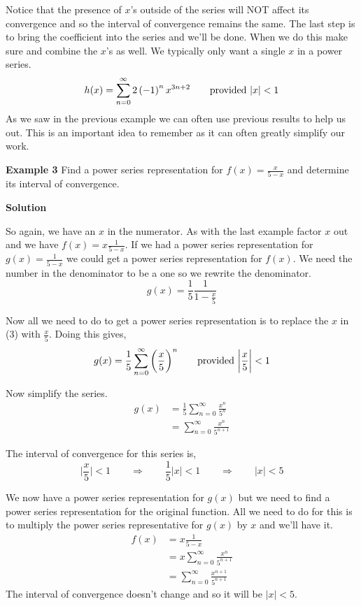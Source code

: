 \documentclass[10pt]{article}
\newcommand{\ds}{\displaystyle}
\begin{document}
Notice that the presence of $x$'s outside of the series will NOT affect its convergence and so the interval of convergence remains the same.  
The last step is to bring the coefficient into the series and we'll be done.  When we do this make sure and combine the $x$'s as well.  We typically only want a single $x$ in a power series.  
$$ h(x) = \sum\limits_{n=0}^{\infty}2\left( -1 \right)^n x^{3n+2} \qquad {\rm provided} \ |x|<1$$
As we saw in the previous example we can often use previous results to help us out.  This is an important idea to remember as it can often greatly simplify our work.  


{\bf Example 3}  Find a power series representation for $\ds f(x) = \frac{x}{5-x}$ and determine its interval of convergence.  

{\bf Solution}

So again, we have an $x$ in the numerator. As with the last example factor $x$ out and we have $\ds f(x) = x\frac{1}{5-x}$.
If we had a power series representation for $\ds g(x) = \frac{1}{5-x}$ we could get a power series representation for $f(x)$.  
We need the number in the denominator to be a one so we rewrite the denominator.  
$$g(x) = \frac{1}{5} \frac{1}{1 - \frac{x}{5}}$$

Now all we need to do to get a power series representation is to replace the $x$ in (3) with $\frac{x}{5}$.  Doing this gives, 
$$g(x) = \frac{1}{5}\sum\limits_{n=0}^{\infty}\bigg(\frac{x}{5}\bigg)^n \qquad {\rm provided} \ \bigg| \frac{x}{5} \bigg|<1$$


Now simplify the series.
\begin{align*}
g(x) & = \frac{1}{5}\sum\limits_{n=0}^{\infty} \frac{x^n}{5^n} \\
                       & = \sum\limits_{n=0}^{\infty} \frac{x^n}{5^{n+1}} 
\end{align*}

The interval of convergence for this series is,
$$\bigg|\frac{x}{5}\bigg|<1 \qquad \Rightarrow \qquad \frac{1}{5}|x|<1 \qquad \Rightarrow \qquad |x|<5$$

We now have a power series representation for $g(x)$ but we need to find a power series representation for the original function.  All we need to do for this is to multiply the power series representative for $g(x)$ by $x$ and we'll have it.  
\begin{align*}
f(x) &=  x \frac{1}{5-x} \\
      & =  x \sum\limits_{n=0}^{\infty} \frac{x^n}{5^{n+1}}\\ 
                      & = \sum\limits_{n=0}^{\infty} \frac{x^{n+1}}{5^{n+1}}
\end{align*}
The interval of convergence doesn't change and so it will be $|x|<5$.
\end{document}
